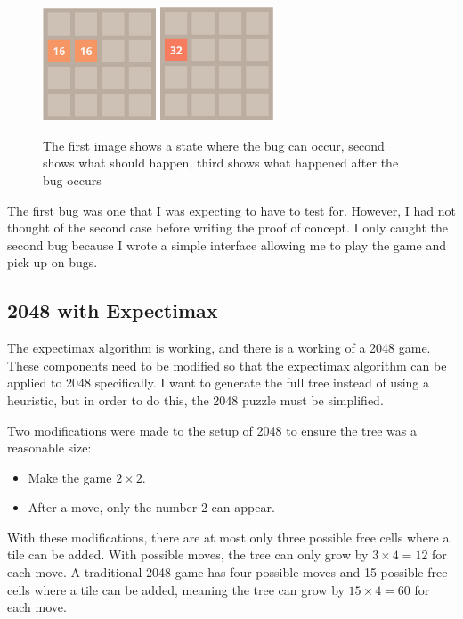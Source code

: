 \documentclass{article}
\begin{document}
\begin{itemize}
\begin{figure}
        \includegraphics[width=0.3\textwidth]{2048_merge2.png}
        \includegraphics[width=0.3\textwidth]{2048_merge3.png}
        \caption{The first image shows a state where the bug can occur, second shows what should happen, third shows what happened after the bug occurs}
        \label{fig:mergebug}
    \end{figure}
\end{itemize}
The first bug was one that I was expecting to have to test for. However, I had not thought of the second case before writing the proof of concept. I only caught the second bug because I wrote a simple interface allowing me to play the game and pick up on bugs.
\subsection{2048 with Expectimax}
\label{subsec:2048_expectimax}
The expectimax algorithm is working, and there is a working of a 2048 game. These components need to be modified so that the expectimax algorithm can be applied to 2048 specifically. 
I want to generate the full tree instead of using a heuristic, but in order to do this, the 2048 puzzle must be simplified.

Two modifications were made to the setup of 2048 to ensure the tree was a reasonable size:
\begin{itemize}
    \item Make the game $2 \times 2$.
    \item After a move, only the number 2 can appear.
\end{itemize}
With these modifications, there are at most only three possible free cells where a tile can be added. With possible moves, the tree can only grow by $3 \times 4 = 12$ for each move.
A traditional 2048 game has four possible moves and 15 possible free cells where a tile can be added, meaning the tree can grow by $15 \times 4 = 60$ for each move.
\end{document}
